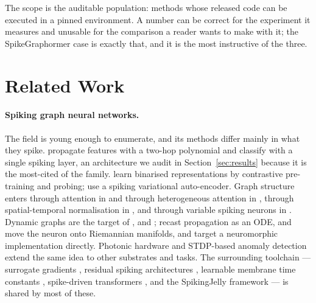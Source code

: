 \documentclass[10pt,twocolumn]{article}
\newcommand{\secref}[1]{Section~\ref{#1}}
\begin{document}
The scope is the auditable population: methods whose released code can be executed in a pinned
environment. A number can be correct for the experiment it measures and unusable for the comparison a
reader wants to make with it; the SpikeGraphormer case is exactly that, and it is the most instructive
of the three.
\section{Related Work}
\label{sec:related}

\paragraph{Spiking graph neural networks.} The field is young enough to enumerate, and its methods
differ mainly in what they spike. \citet{zhu2022spiking} propagate features with a two-hop polynomial
and classify with a single spiking layer, an architecture we audit in \secref{sec:results} because it
is the most-cited of the family. \citet{li2023bit1} learn binarised representations by contrastive
pre-training and probing; \citet{yang2022svgae} use a spiking variational auto-encoder. Graph
structure enters through attention in \citet{sun2024spikegraphormer} and through heterogeneous
attention in \citet{cao2025hetgat}, through spatial-temporal normalisation in
\citet{xu2024unveiling}, and through variable spiking neurons in \citet{jain2024hybrid}. Dynamic
graphs are the target of \citet{chen2024signn}, \citet{yin2024dgsnn} and \citet{jahin2026chronospike};
\citet{fan2024continuous} recast propagation as an ODE, \citet{sun2024riemannian} and
\citet{zhang2025geometry} move the neuron onto Riemannian manifolds, and \citet{snyder2024loihi}
target a neuromorphic implementation directly. Photonic hardware \citep{yu2025photonic} and
STDP-based anomaly detection \citep{fofanah2026anomaly} extend the same idea to other substrates and
tasks. The surrounding toolchain --- surrogate gradients \citep{neftci2019surrogate}, residual
spiking architectures \citep{fang2021deep,zheng2021going}, learnable membrane time constants
\citep{fang2021incorporating}, spike-driven transformers \citep{yao2023spiking,yao2024spikingv2}, and
the SpikingJelly framework \citep{fang2023spikingjelly} --- is shared by most of these.
\end{document}
